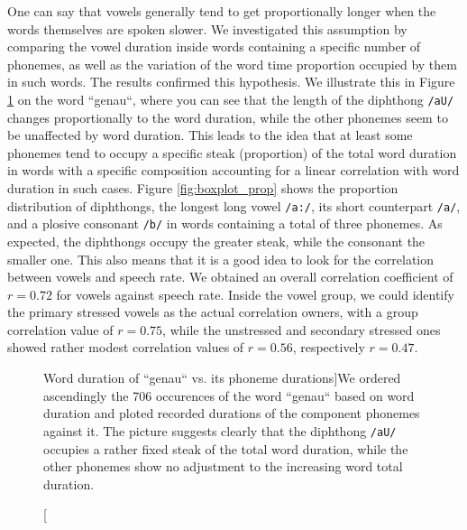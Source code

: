 \documentclass[11pt,a4paper]{scrbook}
\begin{document}
One can say that vowels generally tend to get proportionally longer when the words themselves are spoken slower. We investigated this assumption by comparing the vowel duration inside words containing a specific number of phonemes, as well as the variation of the word time proportion occupied by them in such words. The results confirmed this hypothesis. We illustrate this in Figure \ref{fig:w_dur_vs_pho} on the word ``genau``, where you can see that the length of the diphthong \texttt{/aU/} changes proportionally to the word duration, while the other phonemes seem to be unaffected by word duration. This leads to the idea that at least some phonemes tend to occupy a specific steak (proportion) of the total word duration in words with a specific composition accounting for a linear correlation with word duration in such cases. Figure \ref{fig:boxplot_prop} shows the proportion distribution of diphthongs, the longest long vowel \texttt{/a:/}, its short counterpart \texttt{/a/}, and a plosive consonant \texttt{/b/} in words containing a total of three phonemes. As expected, the diphthongs occupy the greater steak, while the consonant the smaller one. This also means that it is a good idea to look for the correlation between vowels and speech rate. We obtained an overall correlation coefficient of $r = 0.72$ for vowels against speech rate. Inside the vowel group, we could identify the primary stressed vowels as the actual correlation owners, with a group correlation value of $r = 0.75$, while the unstressed and secondary stressed ones showed rather modest correlation values of $r = 0.56$, respectively $r = 0.47$. 

\begin{figure}[htbp]
	\noindent{}
	\centering
	\caption[Word duration of ``genau`` vs. its phoneme durations]{We ordered ascendingly the 706 occurences of the word ``genau`` based on word duration and ploted recorded durations of the component phonemes against it. The picture suggests clearly that the diphthong \texttt{/aU/} occupies a rather fixed steak of the total word duration, while the other phonemes show no adjustment to the increasing word total duration. }
	\label{fig:w_dur_vs_pho}
\end{figure}
\end{document}
